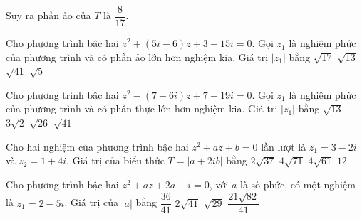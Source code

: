 \begin{ex}
\begin{ex}
{		Suy ra phần ảo của $T$ là $\dfrac{8}{17}$.
	}
\end{ex}
\begin{ex}%
Cho phương trình bậc hai $z^2+(5i-6)z+3-15i=0$. Gọi $z_1$ là nghiệm phức của phương trình và có phần ảo lớn hơn nghiệm kia. Giá trị $\left|z_1\right|$ bằng
	\choice
	{$\sqrt{17}$}
	{\True$\sqrt{13}$}
	{$\sqrt{41}$}
	{$\sqrt{5}$}
\end{ex}
\begin{ex}%
Cho phương trình bậc hai $z^2-(7-6i) z+7-19i=0$. Gọi $z_1$ là nghiệm phức của phương trình và có phần thực lớn hơn nghiệm kia. Giá trị $\left|z_1\right|$ bằng
	\choice
	{$\sqrt{13}$}
	{$3 \sqrt{2}$}
	{$\sqrt{26}$}
	{\True$\sqrt{41}$}
\end{ex}
\begin{ex}%
Cho hai nghiệm của phương trình bậc hai $z^2+az+b=0$ lần lượt là $z_1=3-2i$ và $z_2=1+4i$. Giá trị của biểu thửc $T=|a+2ib|$ bằng
	\choice
	{$2 \sqrt{37}$}
	{$4 \sqrt{71}$}
	{\True$4 \sqrt{61}$}
	{$12$}
\end{ex}
\begin{ex}%
Cho phương trình bậc hai $z^2+az+2a-i=0$, với $a$ là số phức, có một nghiệm là $z_1=2-5i$. Giá trị của $|a|$ bằng
	\choice
	{$\dfrac{36}{41}$}
	{$2 \sqrt{41}$}
	{$\sqrt{29}$}
	{\True$\dfrac{21 \sqrt{82}}{41}$}

\end{ex}
\end{ex}
